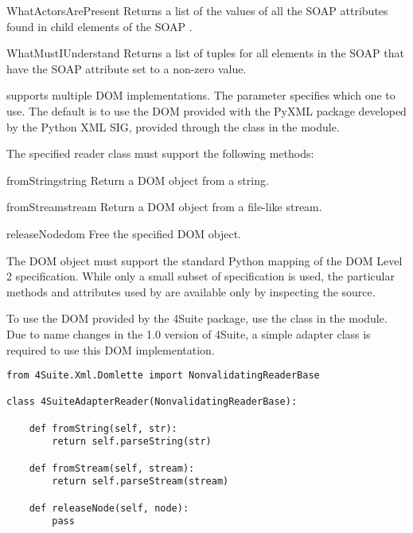 \begin{methoddesc}{WhatActorsArePresent}{}
Returns a list of the values of all the SOAP  attributes
found in child elements of the SOAP .
\end{methoddesc}

\begin{methoddesc}{WhatMustIUnderstand}{}
Returns a list of  tuples for all elements in the
SOAP  that have the SOAP  attribute set
to a non-zero value.
\end{methoddesc}

\ZSI{} supports multiple DOM implementations.
The  parameter specifies which one to use.
The default is to use the DOM provided with the PyXML package developed
by the Python XML SIG, provided through the  class
in the  module.

The specified reader class must support the following methods:

\begin{methoddesc}{fromString}{string}
Return a DOM object from a string.
\end{methoddesc}

\begin{methoddesc}{fromStream}{stream}
Return a DOM object from a file-like stream.
\end{methoddesc}

\begin{methoddesc}{releaseNode}{dom}
Free the specified DOM object.
\end{methoddesc}

The DOM object must support the standard Python mapping of the DOM Level 2
specification.
While only a small subset of specification is used, the particular
methods and attributes used by \ZSI{} are available only
by inspecting the source.

To use the  DOM provided by the 4Suite package, use the
 class in the  module.
Due to name changes in the 1.0 version of 4Suite, a simple adapter class
is required to use this DOM implementation. 

\begin{verbatim}
from 4Suite.Xml.Domlette import NonvalidatingReaderBase

class 4SuiteAdapterReader(NonvalidatingReaderBase):

    def fromString(self, str):
        return self.parseString(str)

    def fromStream(self, stream):
        return self.parseStream(stream)

    def releaseNode(self, node):
        pass
\end{verbatim}
